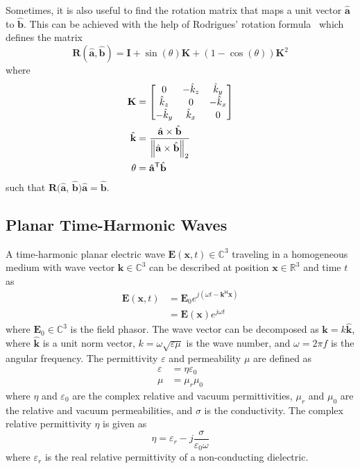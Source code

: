 Sometimes, it is also useful to find the rotation matrix that maps a unit vector $\hat{\mathbf{a}}$ to $\hat{\mathbf{b}}$.
This can be achieved with the help of Rodrigues' rotation formula~\cite{Wikipedia_Rodrigues} which defines the matrix
\begin{equation}
    \label{eq:rodrigues_matrix}
    \mathbf{R}(\hat{\mathbf{a}}, \hat{\mathbf{b}}) = \mathbf{I} + \sin(\theta)\mathbf{K} + (1-\cos(\theta)) \mathbf{K}^2
\end{equation}
where
\begin{align}
    \mathbf{K} &= \begin{bmatrix}
                            0 & -\hat{k}_z &  \hat{k}_y \\
                    \hat{k}_z &          0 & -\hat{k}_x \\
                   -\hat{k}_y &  \hat{k}_x &          0
                 \end{bmatrix}\\
    \hat{\mathbf{k}} &= \frac{\hat{\mathbf{a}} \times \hat{\mathbf{b}}}{\left\lVert\hat{\mathbf{a}} \times \hat{\mathbf{b}}\right\rVert_2}\\
    \theta &=\hat{\mathbf{a}}^\mathsf{T}\hat{\mathbf{b}}
\end{align}
such that $\mathbf{R}(\hat{\mathbf{a}}$, $\hat{\mathbf{b}})\hat{\mathbf{a}}=\hat{\mathbf{b}}$.


\subsection{Planar Time-Harmonic Waves}

A time-harmonic planar electric wave $\mathbf{E}(\mathbf{x}, t)\in\mathbb{C}^3$ traveling in a homogeneous medium with wave vector $\mathbf{k}\in\mathbb{C}^3$ can be described at position $\mathbf{x}\in\mathbb{R}^3$ and time $t$ as
\begin{align}
    \mathbf{E}(\mathbf{x}, t) &= \mathbf{E}_0 e^{j(\omega t -\mathbf{k}^{\mathsf{H}}\mathbf{x})}\\
                                &= \mathbf{E}(\mathbf{x}) e^{j\omega t}
\end{align}
where $\mathbf{E}_0\in\mathbb{C}^3$ is the field phasor. The wave vector can be decomposed as $\mathbf{k}=k \hat{\mathbf{k}}$, where $\hat{\mathbf{k}}$ is a unit norm vector, $k=\omega\sqrt{\varepsilon\mu}$ is the wave number, and $\omega=2\pi f$ is the angular frequency. The permittivity $\varepsilon$ and permeability $\mu$ are defined as
\begin{align}
    \varepsilon &= \eta \varepsilon_0 \label{eq:epsilon}\\
    \mu &= \mu_r \mu_0 \label{eq:mu}
\end{align}
where $\eta$ and $\varepsilon_0$ are the complex relative and vacuum permittivities, $\mu_r$ and $\mu_0$ are the relative and vacuum permeabilities, and $\sigma$ is the conductivity.
The complex relative permittivity $\eta$ is given as
\begin{equation}
    \label{eq:eta}
    \eta = \varepsilon_r - j\frac{\sigma}{\varepsilon_0\omega}
\end{equation}
where $\varepsilon_r$ is the real relative permittivity of a non-conducting dielectric.


